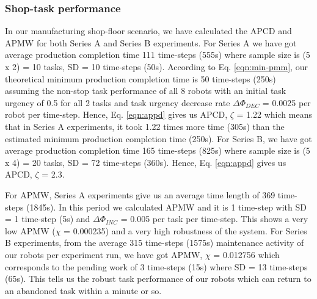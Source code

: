 \documentclass[smallcondensed]{svjour3}
\begin{document}
\subsubsection{Shop-task performance}
In our manufacturing shop-floor scenario, we have calculated the APCD and APMW for both Series A and Series B experiments. For Series A we have got  average production completion time 111 time-steps (555s) where sample size is (5 x 2) = 10 tasks, SD = 10 time-steps (50s). According to Eq. \ref{eqn:min-pmm}, our theoretical minimum production completion time is 50 time-steps (250s) assuming the non-stop task performance of all 8 robots with an initial task urgency of 0.5 for all 2 tasks and task urgency decrease rate $\Delta \Phi_{DEC }$ = 0.0025 per robot per time-step.  Hence, Eq. \ref{eqn:appd} gives us APCD, $\zeta$ = 1.22 which means that in Series A experiments, it took 1.22 times more time (305s) than the estimated minimum production completion time (250s). For Series B, we have got average production completion time 165 time-steps (825s) where sample size is (5 x 4) = 20 tasks, SD = 72 time-steps (360s).  Hence, Eq. \ref{eqn:appd} gives us APCD, $\zeta$ = 2.3.

For APMW, Series A experiments give us an average time length of 369 time-steps (1845s).  In this period we calculated APMW and it is 1 time-step with SD = 1 time-step (5s) and $\Delta \Phi_{INC}$ = 0.005 per task per time-step. This shows a very low APMW ($\chi$ = 0.000235) and a very high robustness of the system. For Series B experiments, from the average 315 time-steps (1575s) maintenance activity of our robots per experiment run, we have got APMW, $\chi$ = 0.012756 which corresponds to the pending work of 3 time-steps (15s) where SD = 13 time-steps (65s). This tells us the robust task performance of our robots which can return to an abandoned task within a minute or so.
\end{document}
